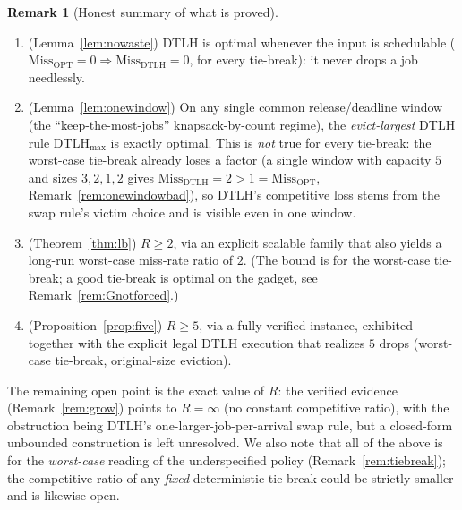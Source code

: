 \documentclass{amsart}
\theoremstyle{definition}
\newtheorem{remark}[theorem]{Remark}
\begin{document}
\begin{remark}[Honest summary of what is proved]
\begin{enumerate}
\item (Lemma~\ref{lem:nowaste}) DTLH is optimal whenever the input is
schedulable ($\mathrm{Miss}_{\mathrm{OPT}}=0\Rightarrow
\mathrm{Miss}_{\mathrm{DTLH}}=0$, for every tie-break): it never drops a job
needlessly.
\item (Lemma~\ref{lem:onewindow}) On any single common release/deadline window
(the ``keep-the-most-jobs'' knapsack-by-count regime), the \emph{evict-largest}
DTLH rule $\mathrm{DTLH}_{\max}$ is exactly optimal. This is \emph{not} true for
every tie-break: the worst-case tie-break already loses a factor (a single window
with capacity $5$ and sizes $3,2,1,2$ gives
$\mathrm{Miss}_{\mathrm{DTLH}}=2>1=\mathrm{Miss}_{\mathrm{OPT}}$,
Remark~\ref{rem:onewindowbad}), so DTLH's competitive loss stems from the swap
rule's victim choice and is visible even in one window.
\item (Theorem~\ref{thm:lb}) $R\ge 2$, via an explicit scalable family that also
yields a long-run worst-case miss-rate ratio of $2$. (The bound is for the
worst-case tie-break; a good tie-break is optimal on the gadget, see
Remark~\ref{rem:Gnotforced}.)
\item (Proposition~\ref{prop:five}) $R\ge 5$, via a fully verified instance,
exhibited together with the explicit legal DTLH execution that realizes $5$
drops (worst-case tie-break, original-size eviction).
\end{enumerate}
The remaining open point is the exact value of $R$: the verified evidence
(Remark~\ref{rem:grow}) points to $R=\infty$ (no constant competitive ratio),
with the obstruction being DTLH's one-larger-job-per-arrival swap rule, but a
closed-form unbounded construction is left unresolved. We also note that all of
the above is for the \emph{worst-case} reading of the underspecified policy
(Remark~\ref{rem:tiebreak}); the competitive ratio of any \emph{fixed}
deterministic tie-break could be strictly smaller and is likewise open.
\end{remark}
\end{document}
